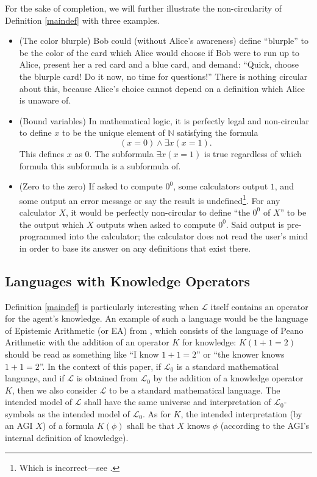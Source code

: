 \documentclass[runningheads]{llncs}
\begin{document}
For the sake of completion, we will further illustrate the non-circularity of
Definition \ref{maindef} with three examples.
\begin{itemize}
  \item
  (The color blurple) Bob could (without Alice's awareness) define ``blurple'' to be the
  color of the card
  which Alice would choose if Bob were to run up to Alice, present her a red card
  and a blue card, and demand: ``Quick, choose the blurple card! Do it now, no time
  for questions!'' There is nothing circular about this, because Alice's choice
  cannot depend on a definition which Alice is unaware of.
  \item
  (Bound variables) In mathematical logic, it is perfectly legal and non-circular to
  define $x$ to be the unique element of $\mathbb N$ satisfying the formula
  \[(x=0)\wedge \exists x(x=1).\]
  This defines $x$ as $0$. The subformula
  $\exists x(x=1)$ is true regardless of which formula this subformula is a subformula of.
  \item
  (Zero to the zero) If asked to compute $0^0$, some calculators output $1$, and some
  output an error message or say the result is undefined\footnote{Which is incorrect---see
  \cite{knuth}.}. For any calculator $X$, it
  would be perfectly non-circular to define ``the $0^0$ of $X$'' to be the output which
  $X$ outputs when asked to compute $0^0$. Said output is pre-programmed into the
  calculator; the calculator does not read the user's mind in order to base its answer
  on any definitions that exist there.
\end{itemize}

\subsection{Languages with Knowledge Operators}

Definition \ref{maindef} is particularly interesting when $\mathscr L$ itself
contains an operator for the agent's knowledge. An example of such a language would be
the language of Epistemic Arithmetic (or EA) from \cite{shapiro}, which consists of the
language of Peano Arithmetic with the addition of an operator $K$ for knowledge:
$K(1+1=2)$ should be read as something like
``I know $1+1=2$'' or ``the knower knows $1+1=2$''. In the context of this paper,
if $\mathscr L_0$ is a standard mathematical language, and if $\mathscr L$ is obtained
from $\mathscr L_0$ by the addition of a knowledge operator $K$, then we also
consider $\mathscr L$ to be a standard mathematical language. The intended model
of $\mathscr L$ shall have the same universe and interpretation of
$\mathscr L_0$-symbols as the intended model of $\mathscr L_0$. As for $K$,
the intended interpretation (by an AGI $X$) of a formula $K(\phi)$ shall be
that $X$ knows $\phi$ (according to the AGI's internal definition of knowledge).
\end{document}
